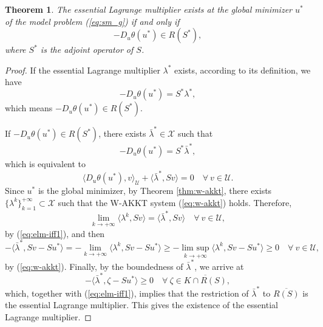\documentclass[leqno]{amsart}
\DeclareMathOperator*\uplim{lim\ sup}
\newtheorem{theorem}{Theorem}[section]
\theoremstyle{definition}
\begin{document}
\begin{theorem}\label{thm:ELM_exist_iff}
The essential Lagrange multiplier exists at the global minimizer $u^*$ of the model problem (\ref{eq:sm_g}) if and only if 
$$ -D_u\theta(u^*) \in R(S^*),$$
where $S^*$ is the adjoint operator of $S$.
\end{theorem}
\begin{proof}
If the essential Lagrange multiplier $\lambda^*$ exists, according to its definition, we have
$$ -D_u\theta(u^*) = S^*\lambda^*,$$
which means $-D_u\theta(u^*) \in R(S^*)$.

If $-D_u\theta(u^*) \in R(S^*)$, there exists $\bar{\lambda}^*\in \mathcal{X}$ such that
$$-D_u\theta(u^*) = S^*\bar{\lambda}^*,$$ 
which is equivalent to
\begin{equation}\label{eq:elm-iff1}
\langle D_u\theta(u^*), v\rangle_\mathcal{U} + \langle \bar{\lambda}^*, Sv\rangle = 0\quad \forall\ v\in \mathcal{U}.
\end{equation}
Since $u^*$ is the global minimizer, by Theorem \ref{thm:w-akkt}, there exists $\{\lambda^k\}_{k=1}^{+\infty}\subset \mathcal{X}$ such that the W-AKKT system (\ref{eq:w-akkt}) holds. Therefore,  
$$\lim\limits_{k\rightarrow + \infty}\langle \lambda^k, Sv\rangle = \langle \bar{\lambda}^*, Sv\rangle\quad \forall\ v\in \mathcal{U},$$
by (\ref{eq:elm-iff1}), and then
$$ - \langle \bar{\lambda}^*, Sv - Su^* \rangle =  -\lim\limits_{k\rightarrow + \infty}\langle \lambda^k, Sv - Su^*\rangle \geq -  \uplim\limits_{k\rightarrow + \infty}\langle \lambda^k, Sv - Su^*\rangle \geq 0\quad \forall\ v\in \mathcal{U},$$
by (\ref{eq:w-akkt}). Finally, by the boundedness of $\bar{\lambda}^*$, we arrive at
$$ - \langle \bar{\lambda}^*, \zeta - Su^* \rangle \geq 0\quad \forall\ \zeta\in \overline{K\cap R(S)},$$
which, together with (\ref{eq:elm-iff1}), implies that the restriction of $\bar{\lambda}^*$ to $\overline{R(S)}$ is the essential Lagrange multiplier. This gives the existence of the essential Lagrange multiplier.
\end{proof}
\end{document}
